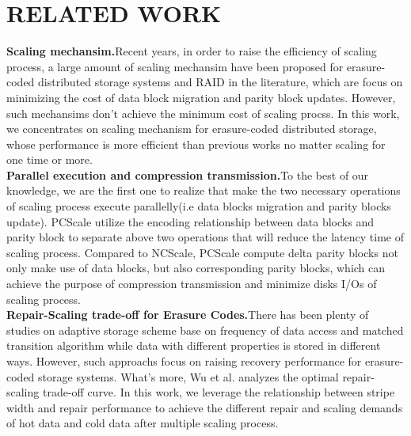 \setlength{\parindent}{0pt}
\section{RELATED WORK}

\textbf{Scaling mechansim.}Recent years, in order to raise the efficiency of 
scaling process, a large amount of scaling mechansim have been proposed for 
erasure-coded distributed storage systems and RAID in the literature, which 
are focus on minimizing the cost of data block  migration and parity block 
updates. However, such mechansims don't achieve the minimum cost of scaling 
procss. In this work, we concentrates on scaling mechanism for erasure-coded
distributed storage, whose performance is more efficient than previous works
no matter scaling for one time or more. \\
\textbf{Parallel execution and compression transmission.}To the best of our 
knowledge, we are the first one to realize that make the two necessary 
operations of scaling process execute parallelly(i.e data blocks migration 
and parity blocks update). PCScale utilize the encoding relationship 
between data blocks and parity block to separate above two operations that 
will reduce the latency time of scaling process. Compared to NCScale, 
PCScale compute delta parity blocks not only make use of data blocks, but 
also corresponding parity blocks, which can achieve the purpose of 
compression transmission and minimize disks I/Os of scaling process.  \\ 
\textbf{Repair-Scaling trade-off for Erasure Codes.}There has been plenty of
studies on adaptive storage scheme base on frequency of data access and 
matched transition algorithm while data with different properties is stored
in different ways. However, such approachs focus on raising recovery 
performance for erasure-coded storage systems. What's more, Wu et al. 
analyzes the optimal repair-scaling trade-off curve. In this work, we 
leverage the relationship between stripe width and repair performance to 
achieve the different repair and scaling demands of hot data and cold data
after multiple scaling process.

